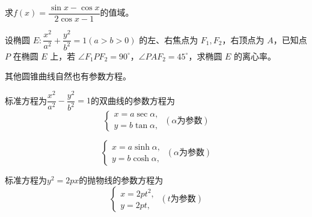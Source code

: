 \begin{exercise}
    求\(f(x)=\dfrac{\sin x-\cos x}{2\cos x -1}\)的值域。
\end{exercise}

\begin{example}
    设椭圆 \(E: \dfrac{x^2}{a^2} + \dfrac{y^2}{b^2} = 1 (a > b > 0)\) 的左、右焦点为 \(F_1, F_2\)，右顶点为 \(A\)，已知点 \(P\) 在椭圆 \(E\) 上，若 \(\angle F_1PF_2 = 90^\circ\)，\(\angle PAF_2 = 45^\circ\)，求椭圆 \(E\) 的离心率。
\end{example}
\begin{example}
    
\end{example}
其他圆锥曲线自然也有参数方程。
\begin{theorem}[双曲线的参数方程]
标准方程为\(\dfrac{x^2}{a^2}-\dfrac{y^2}{b^2}=1\)的双曲线的参数方程为
    \[\left\{
    \begin{gathered}
        x = a \sec \alpha, \\
        y = b \tan \alpha,
    \end{gathered}\right.
    \ (\alpha\text{为参数})
    \]
\end{theorem}

\[\left\{
    \begin{gathered}
        x = a \sinh \alpha, \\
        y = b \cosh \alpha,
    \end{gathered}\right.
    \ (\alpha\text{为参数})
    \]

\begin{theorem}
标准方程为\(y^2=2px\)的抛物线的参数方程为
\[\left\{
    \begin{gathered}
        x = 2pt^2, \\
        y = 2pt,
    \end{gathered}\right.
    \ (t\text{为参数})
    \]
\end{theorem}


\clearpage



